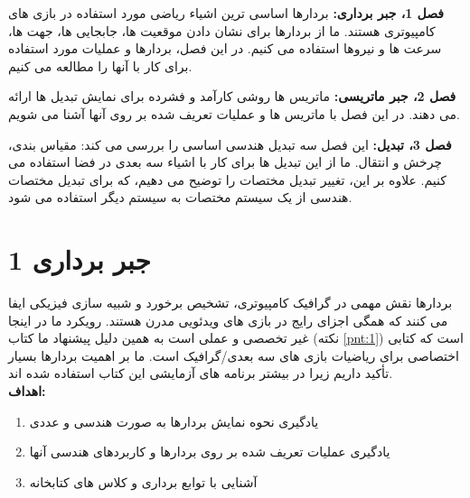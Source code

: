 {\begin{spacing}{1.4}
        \textbf{فصل 1، جبر برداری:} بردارها اساسی ترین اشیاء ریاضی مورد استفاده در بازی های کامپیوتری هستند.
        ما از بردارها برای نشان دادن موقعیت ها، جابجایی ها، جهت ها، سرعت ها و نیروها استفاده می کنیم.
        در این فصل، بردارها و عملیات مورد استفاده برای کار با آنها را مطالعه می کنیم.

        \textbf{فصل 2، جبر ماتریسی:} ماتریس ها روشی کارآمد و فشرده برای نمایش تبدیل ها ارائه می دهند.
        در این فصل با ماتریس ها و عملیات تعریف شده بر روی آنها آشنا می شویم.

        \textbf{فصل 3، تبدیل:} این فصل سه تبدیل هندسی اساسی را بررسی می کند: مقیاس بندی، چرخش و انتقال.
        ما از این تبدیل ها برای کار با اشیاء سه بعدی در فضا استفاده می کنیم.
        علاوه بر این، تغییر تبدیل مختصات را توضیح می دهیم، که برای تبدیل مختصات هندسی از یک سیستم مختصات به سیستم دیگر استفاده می شود.
    \end{spacing}
}

\setcounter{chapter}{1}

\textbf{\vspace{80pt}}

\chapter{\textbf{1 جبر برداری}}
\textbf{\vspace{70pt}}
{
    \Large
    \begin{spacing}{1.5}
        بردارها نقش مهمی در گرافیک کامپیوتری، تشخیص برخورد و شبیه سازی فیزیکی ایفا می کنند که همگی اجزای رایج در بازی های ویدئویی مدرن هستند.
        رویکرد ما در اینجا غیر تخصصی و عملی است به همین دلیل پیشنهاد ما کتاب  (نکته \ref{pnt:1}) است که کتابی اختصاصی برای ریاضیات بازی های سه بعدی/گرافیک است.
        ما بر اهمیت بردارها بسیار تأکید داریم زیرا در بیشتر برنامه های آزمایشی این کتاب استفاده شده اند.
        \\

        \textbf{\LARGE \hspace{-40pt}اهداف:}
        \begin{enumerate}[label=\textbf{\arabic*}.]
            \item {یادگیری نحوه نمایش بردارها به صورت هندسی و عددی}
            \item {یادگیری عملیات تعریف شده بر روی بردارها و کاربردهای هندسی آنها}
            \item {آشنایی با توابع برداری و کلاس های کتابخانه }
        \end{enumerate}
    \end{spacing}
}
\newpage

